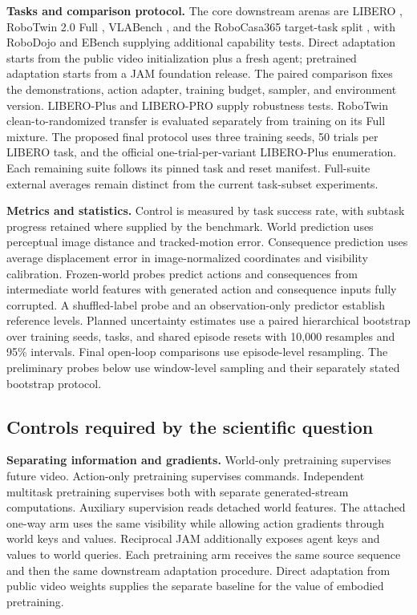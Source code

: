 \textbf{Tasks and comparison protocol.}
The core downstream arenas are LIBERO \citep{libero}, RoboTwin 2.0 Full \citep{robotwin}, VLABench
\citep{vlabench}, and the RoboCasa365 target-task split \citep{robocasa365}, with RoboDojo and EBench supplying additional capability tests. Direct adaptation
starts from the public video initialization plus a fresh agent; pretrained adaptation starts from a
JAM foundation release. The paired comparison fixes the demonstrations, action adapter, training
budget, sampler, and environment version. LIBERO-Plus \citep{liberoplus} and LIBERO-PRO
\citep{liberopro} supply robustness tests. RoboTwin clean-to-randomized transfer is evaluated
separately from training on its Full mixture. The proposed final protocol uses three training seeds,
50 trials per LIBERO task, and the official one-trial-per-variant LIBERO-Plus enumeration. Each
remaining suite follows its pinned task and reset manifest. Full-suite external averages remain
distinct from the current task-subset experiments.

\textbf{Metrics and statistics.}
Control is measured by task success rate, with subtask progress retained where supplied by the
benchmark. World prediction uses perceptual image distance and tracked-motion error. Consequence
prediction uses average displacement error in image-normalized coordinates and visibility
calibration. Frozen-world probes predict actions and consequences from intermediate world features
with generated action and consequence inputs fully corrupted. A shuffled-label probe and an
observation-only predictor establish reference levels. Planned uncertainty estimates use a paired
hierarchical bootstrap over training seeds, tasks, and shared episode resets with 10,000 resamples
and 95\% intervals. Final open-loop comparisons use episode-level resampling. The preliminary probes below use
window-level sampling and their separately stated bootstrap protocol.


\subsection{Controls required by the scientific question}
\label{app:controls}
\textbf{Separating information and gradients.}
World-only pretraining supervises future video. Action-only pretraining supervises commands.
Independent multitask pretraining supervises both with separate generated-stream computations.
Auxiliary supervision reads detached world features. The attached one-way arm uses the same
visibility while allowing action gradients through world keys and values. Reciprocal JAM
additionally exposes agent keys and values to world queries. Each pretraining arm receives the same
source sequence and then the same downstream adaptation procedure. Direct adaptation from public
video weights supplies the separate baseline for the value of embodied pretraining.

